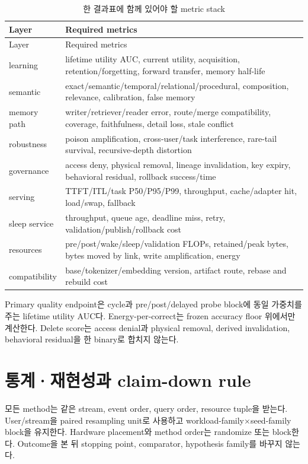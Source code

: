 \begin{longtable}{L{0.17\textwidth} L{0.74\textwidth}}
\caption{한 결과표에 함께 있어야 할 metric stack}\label{tab:benchmark-metrics}\\
\toprule
Layer & Required metrics \\
\midrule
\endfirsthead
\toprule
Layer & Required metrics \\
\midrule
\endhead
learning & lifetime utility AUC, current utility, acquisition, retention/forgetting, forward transfer, memory half-life \\
semantic & exact/semantic/temporal/relational/procedural, composition, relevance, calibration, false memory \\
memory path & writer/retriever/reader error, route/merge compatibility, coverage, faithfulness, detail loss, stale conflict \\
robustness & poison amplification, cross-user/task interference, rare-tail survival, recursive-depth distortion \\
governance & access deny, physical removal, lineage invalidation, key expiry, behavioral residual, rollback success/time \\
serving & TTFT/ITL/task P50/P95/P99, throughput, cache/adapter hit, load/swap, fallback \\
sleep service & throughput, queue age, deadline miss, retry, validation/publish/rollback cost \\
resources & pre/post/wake/sleep/validation FLOPs, retained/peak bytes, bytes moved by link, write amplification, energy \\
compatibility & base/tokenizer/embedding version, artifact route, rebase and rebuild cost \\
\bottomrule
\end{longtable}

Primary quality endpoint은 cycle과 pre/post/delayed probe block에 동일 가중치를 주는 lifetime utility AUC다.
Energy-per-correct는 frozen accuracy floor 위에서만 계산한다. Delete score는 access denial과 physical removal,
derived invalidation, behavioral residual을 한 binary로 합치지 않는다.

\section{통계·재현성과 claim-down rule}

모든 method는 같은 stream, event order, query order, resource tuple을 받는다. User/stream을 paired resampling
unit로 사용하고 workload-family$\times$seed-family block을 유지한다. Hardware placement와 method order는
randomize 또는 block한다. Outcome을 본 뒤 stopping point, comparator, hypothesis family를 바꾸지 않는다.

